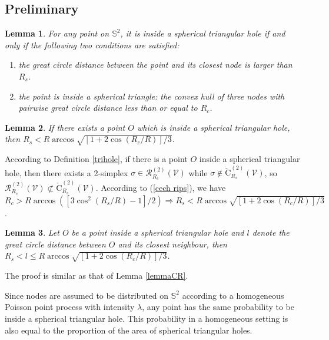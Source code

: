 \documentclass[journal, twoside]{IEEEtran}
\newtheorem{lemma}{Lemma}
\begin{document}
\subsection{Preliminary} \label{secboundpre}
\begin{lemma} \label{condition} For any point on $\mathbb{S}^2$, it
  is inside a spherical triangular hole if and only if the following two conditions are 
  satisfied:
  \begin{enumerate}
  \item the great circle distance between the point and its closest node is
    larger than $R_s$.
  \item the point is inside a spherical triangle: the convex hull of three nodes with
  pairwise great circle distance less than or equal to $R_c$.
  \end{enumerate}
\end{lemma}

\begin{lemma} \label{distance} If there exists a point $O$ which
  is inside a spherical triangular hole, then $R_s < R\arccos \sqrt{[1+2\cos(R_c/R)]/3} $. 
\end{lemma}

\begin{IEEEproof}
According to Definition \ref{trihole}, if there is a point $O$ inside a spherical 
triangular hole, then there exists a 2-simplex $\sigma \in \mathcal{R}_{R_c}^{(2)}(\mathcal{V})$
while $\sigma \notin \check{\textrm{C}}_{R_s}^{(2)}(\mathcal{V})$, so  
$\mathcal{R}_{R_c}^{(2)}(\mathcal{V}) \not \subset \check{\textrm{C}}_{R_s}^{(2)}(\mathcal{V})$.
According to (\ref{cech rips}), we have $R_c > R \arccos ([3\cos^2(R_s/R)-1]/2) \Rightarrow
R_s < R\arccos \sqrt{[1+2\cos(R_c/R)]/3}$.
\end{IEEEproof}

\begin{lemma} \label{closedist} Let $O$ be a point inside a spherical triangular hole
  and $l$ denote the great circle distance between $O$ and its closest neighbour, then
  $R_s < l \leq R\arccos \sqrt{[1+2\cos(R_c/R)]/3}$.
\end{lemma}

The proof is similar as that of Lemma \ref{lemmaCR}.


Since nodes are assumed to be distributed on $\mathbb{S}^2$ according to 
a homogeneous Poisson point process with intensity $\lambda$, any point
has the same probability to be inside a spherical triangular hole. 
This probability in a homogeneous setting is also equal to
the proportion of the area of spherical triangular holes. 
\end{document}
